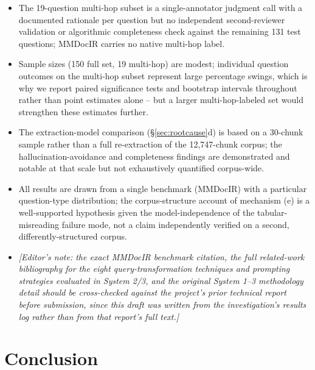 \documentclass[sigconf,anonymous,review]{acmart}
\begin{document}
\begin{itemize}
\item The 19-question multi-hop subset is a single-annotator judgment call with a documented rationale per question but no independent second-reviewer validation or algorithmic completeness check against the remaining 131 test questions; MMDocIR carries no native multi-hop label.
\item Sample sizes (150 full set, 19 multi-hop) are modest; individual question outcomes on the multi-hop subset represent large percentage swings, which is why we report paired significance tests and bootstrap intervals throughout rather than point estimates alone -- but a larger multi-hop-labeled set would strengthen these estimates further.
\item The extraction-model comparison (\S\ref{sec:rootcause}d) is based on a 30-chunk sample rather than a full re-extraction of the 12{,}747-chunk corpus; the hallucination-avoidance and completeness findings are demonstrated and notable at that scale but not exhaustively quantified corpus-wide.
\item All results are drawn from a single benchmark (MMDocIR) with a particular question-type distribution; the corpus-structure account of mechanism (e) is a well-supported hypothesis given the model-independence of the tabular-misreading failure mode, not a claim independently verified on a second, differently-structured corpus.
\item \emph{[Editor's note: the exact MMDocIR benchmark citation, the full related-work bibliography for the eight query-transformation techniques and prompting strategies evaluated in System 2/3, and the original System 1--3 methodology detail should be cross-checked against the project's prior technical report before submission, since this draft was written from the investigation's results log rather than from that report's full text.]}
\end{itemize}

\section{Conclusion}
\end{document}
